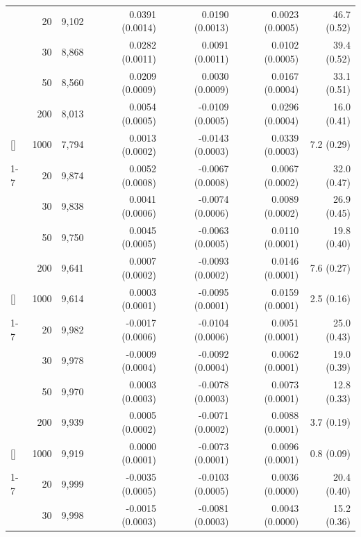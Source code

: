 \documentclass[
  nonatbib,
  authoryear,
  preprint]{elsarticle}
\begin{document}
\begin{longtable}[t]{lrrrrrr}
\endfoot
\bottomrule
\endlastfoot
 & 20 & 9,102 & 0.0391 (0.0014) & 0.0190 (0.0013) & 0.0023 (0.0005) & 46.7 (0.52)\\
\nopagebreak
 & 30 & 8,868 & 0.0282 (0.0011) & 0.0091 (0.0011) & 0.0102 (0.0005) & 39.4 (0.52)\\
\nopagebreak
 & 50 & 8,560 & 0.0209 (0.0009) & 0.0030 (0.0009) & 0.0167 (0.0004) & 33.1 (0.51)\\
\nopagebreak
 & 200 & 8,013 & 0.0054 (0.0005) & -0.0109 (0.0005) & 0.0296 (0.0004) & 16.0 (0.41)\\
\nopagebreak
\multirow[t]{-4}{*}[\normalbaselineskip]{\raggedright\arraybackslash 5} & 1000 & 7,794 & 0.0013 (0.0002) & -0.0143 (0.0003) & 0.0339 (0.0003) & 7.2 (0.29)\\
\cmidrule{1-7}\pagebreak[0]
 & 20 & 9,874 & 0.0052 (0.0008) & -0.0067 (0.0008) & 0.0067 (0.0002) & 32.0 (0.47)\\
\nopagebreak
 & 30 & 9,838 & 0.0041 (0.0006) & -0.0074 (0.0006) & 0.0089 (0.0002) & 26.9 (0.45)\\
\nopagebreak
 & 50 & 9,750 & 0.0045 (0.0005) & -0.0063 (0.0005) & 0.0110 (0.0001) & 19.8 (0.40)\\
\nopagebreak
 & 200 & 9,641 & 0.0007 (0.0002) & -0.0093 (0.0002) & 0.0146 (0.0001) & 7.6 (0.27)\\
\nopagebreak
\multirow[t]{-4}{*}[\normalbaselineskip]{\raggedright\arraybackslash 10} & 1000 & 9,614 & 0.0003 (0.0001) & -0.0095 (0.0001) & 0.0159 (0.0001) & 2.5 (0.16)\\
\cmidrule{1-7}\pagebreak[0]
 & 20 & 9,982 & -0.0017 (0.0006) & -0.0104 (0.0006) & 0.0051 (0.0001) & 25.0 (0.43)\\
\nopagebreak
 & 30 & 9,978 & -0.0009 (0.0004) & -0.0092 (0.0004) & 0.0062 (0.0001) & 19.0 (0.39)\\
\nopagebreak
 & 50 & 9,970 & 0.0003 (0.0003) & -0.0078 (0.0003) & 0.0073 (0.0001) & 12.8 (0.33)\\
\nopagebreak
 & 200 & 9,939 & 0.0005 (0.0002) & -0.0071 (0.0002) & 0.0088 (0.0001) & 3.7 (0.19)\\
\nopagebreak
\multirow[t]{-4}{*}[\normalbaselineskip]{\raggedright\arraybackslash 15} & 1000 & 9,919 & 0.0000 (0.0001) & -0.0073 (0.0001) & 0.0096 (0.0001) & 0.8 (0.09)\\
\cmidrule{1-7}\pagebreak[0]
 & 20 & 9,999 & -0.0035 (0.0005) & -0.0103 (0.0005) & 0.0036 (0.0000) & 20.4 (0.40)\\
\nopagebreak
 & 30 & 9,998 & -0.0015 (0.0003) & -0.0081 (0.0003) & 0.0043 (0.0000) & 15.2 (0.36)\\

\end{longtable}
\end{document}
